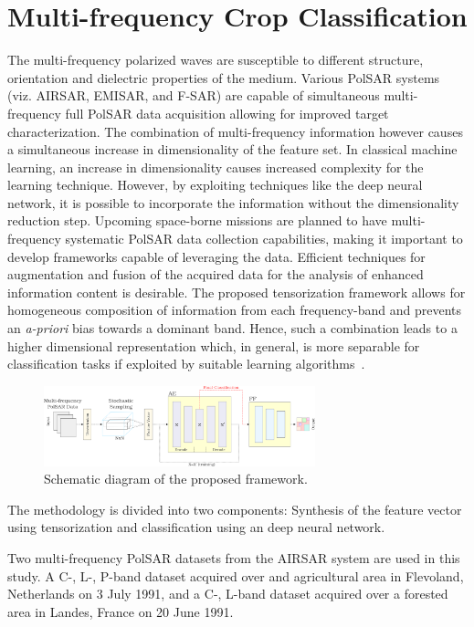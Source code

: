 \documentclass[12pt, a4paper]{article}
\begin{document}
\section{Multi-frequency Crop Classification}
The multi-frequency polarized waves are susceptible to different structure, orientation and dielectric
properties of the medium. Various PolSAR systems (viz. AIRSAR, EMISAR, and F-SAR) are capable of simultaneous multi-frequency full PolSAR data acquisition allowing for improved target characterization. The combination of multi-frequency information however causes a simultaneous increase in dimensionality of the feature set. In classical machine learning, an increase in dimensionality causes increased complexity for the learning technique. However, by exploiting techniques like the deep neural network, it is possible to incorporate the information without the dimensionality reduction step. Upcoming space-borne missions are planned to have multi-frequency systematic PolSAR data collection capabilities, making it important to develop frameworks capable of leveraging the data.
Efficient techniques for augmentation and fusion of the acquired data for the analysis of enhanced information content is desirable. The proposed tensorization framework allows for homogeneous composition of information from each frequency-band and prevents an \emph{a-priori} bias towards a dominant band. Hence, such a combination leads to a higher dimensional representation which, in general, is more separable for classification tasks if exploited by suitable learning algorithms~\cite{smolensky1990tensor}. 

\begin{figure}
	\centering
	\includegraphics[width=0.7\textwidth]{Figures/AE}
	\caption{Schematic diagram of the proposed framework.}
	\label{fig:ANN}
\end{figure}


The methodology is divided into two components: Synthesis of the feature vector using tensorization and classification using an deep neural network.

Two multi-frequency PolSAR datasets from the AIRSAR system are used in this study. A C-, L-, P-band dataset  acquired over and agricultural area in Flevoland, Netherlands on 3 July 1991, and a C-, L-band dataset acquired over a forested area in Landes, France on 20 June 1991.
\end{document}
